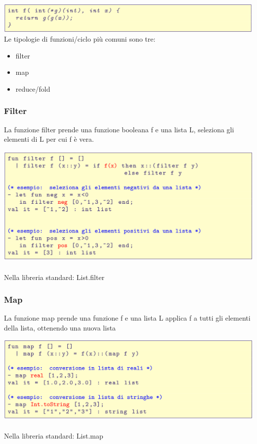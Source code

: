 \documentclass[10pt]{article}
\begin{document}
\includegraphics[scale=0.2]{Immagini/ml31.png}
Le tipologie di funzioni/ciclo più comuni sono tre:
\begin{itemize}
    \item filter
    \item map
    \item reduce/fold
\end{itemize}
\subsubsection{Filter}
La funzione filter prende una funzione booleana f e una lista L, seleziona gli elementi di L per cui f è vera.

\includegraphics[scale=0.2]{Immagini/ml32.png}
\\\\
Nella libreria standard: List.filter
\subsubsection{Map}
La funzione map prende una funzione f e una lista L
applica f a tutti gli elementi della lista, ottenendo una nuova lista

\includegraphics[scale=0.2]{Immagini/ml33.png}
\\\\
Nella libreria standard: List.map
\end{document}

